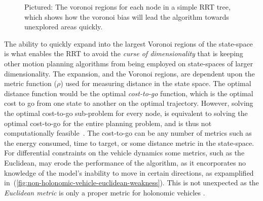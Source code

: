 \begin{figure}
  \caption{Pictured: The voronoi regions for each node in a simple RRT tree,
    which shows how the voronoi bias will lead the algorithm towards unexplored
    areas quickly.}
  \label{fig:rrt-voronoi}
\end{figure}

The ability to quickly expand into the largest Voronoi regions of the
state-space is what enables the \ac{RRT} to avoid the \textit{curse of
  dimensionality} that is keeping other motion planning algorithms from being
employed on state-spaces of larger dimensionality. The expansion, and the
Voronoi regions, are dependent upon the metric function (\(\rho\)) used for
measuring distance in the state space. The optimal distance function would be
the optimal \textit{cost-to-go} function, which is the optimal cost to go from
one state to another on the optimal trajectory. However, solving the optimal
cost-to-go sub-problem for every node, is equivalent to solving the optimal
cost-to-go for the entire planning problem, and is thus not computationally
feasible~\cite{Lav06}. The cost-to-go can be any number of metrics such as the
energy consumed, time to target, or some distance metric in the state-space. For
differential constraints on the vehicle dynamics some metrics, such as the
Euclidean, may erode the performance of the algorithm, as it encorporates no
knowledge of the model's inability to move in certain directions, as
expamplified in~(\ref{fig:non-holonomic-vehicle-euclidean-weakness}). This is
not unexpected as the \textit{Euclidean metric} is only a proper metric for
holonomic vehicles \cite{parkFeedbackMotionPlanning2015}.

